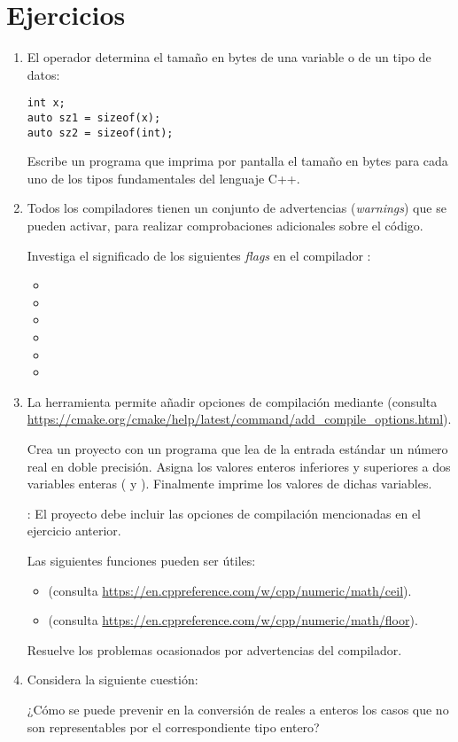 \section{Ejercicios}

\begin{enumerate}

\item El operador  determina el tamaño en bytes de una variable o de
un tipo de datos:

\begin{lstlisting}
int x;
auto sz1 = sizeof(x);
auto sz2 = sizeof(int);
\end{lstlisting}

Escribe un programa que imprima por pantalla el tamaño en bytes para cada uno de los
tipos fundamentales del lenguaje C++.

\item Todos los compiladores tienen un conjunto de advertencias (\emph{warnings})
      que se pueden activar, para realizar comprobaciones adicionales sobre el
      código. 

      Investiga el significado de los siguientes \emph{flags} en el
      compilador :
\begin{itemize}
  \item {}
  \item {}
  \item {}
  \item {}
  \item {}
  \item {}
\end{itemize}

\item La herramienta  permite añadir opciones de compilación mediante
      (consulta \url{https://cmake.org/cmake/help/latest/command/add_compile_options.html}).

      Crea un proyecto con un programa que lea de la entrada estándar un número
      real en doble precisión. Asigna los valores enteros inferiores y superiores
      a dos variables enteras ( y ). Finalmente imprime
      los valores de dichas variables.

      : El proyecto debe incluir las opciones de compilación mencionadas
      en el ejercicio anterior.

      Las siguientes funciones pueden ser útiles:
      \begin{itemize}
        \item {} 
              (consulta \url{https://en.cppreference.com/w/cpp/numeric/math/ceil}).
        \item {} 
              (consulta \url{https://en.cppreference.com/w/cpp/numeric/math/floor}).
      \end{itemize}

      Resuelve los problemas ocasionados por advertencias del compilador.

\item Considera la siguiente cuestión:

      ¿Cómo se puede prevenir en la conversión de reales a enteros los casos que
      no son representables por el correspondiente tipo entero?
     

\end{enumerate}
